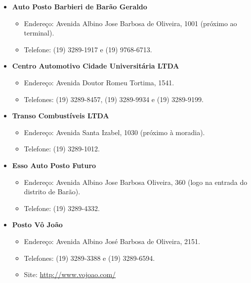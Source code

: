 \begin{itemize}
\item  \textbf{Auto Posto Barbieri de Barão Geraldo}
\begin{itemize}
\item  Endereço: Avenida Albino Jose Barbosa de Oliveira, 1001 (próximo ao terminal).
\item  Telefone: (19) 3289-1917 e (19) 9768-6713.
\end{itemize}
\end{itemize}

\begin{itemize}
\item  \textbf{Centro Automotivo Cidade Universitária LTDA}
\begin{itemize}
\item  Endereço: Avenida Doutor Romeu Tortima, 1541.
\item  Telefones: (19) 3289-8457, (19) 3289-9934 e (19) 3289-9199.
\end{itemize}
\end{itemize}

\begin{itemize}
\item  \textbf{Transo Combustíveis LTDA}
\begin{itemize}
\item  Endereço: Avenida Santa Izabel, 1030 (próximo à moradia).
\item  Telefone: (19) 3289-1012.
\end{itemize}
\end{itemize}

\begin{itemize}
\item  \textbf{Esso Auto Posto Futuro}
\begin{itemize}
\item  Endereço: Avenida Albino Jose Barbosa Oliveira, 360 (logo na entrada do distrito de Barão).
\item  Telefone: (19) 3289-4332.
\end{itemize}
\end{itemize}

\begin{itemize}
\item  \textbf{Posto Vô João}
\begin{itemize}
\item  Endereço: Avenida Albino José Barbosa de Oliveira, 2151.
\item  Telefones: (19) 3289-3388 e (19) 3289-6594.
\item  Site: \url{http://www.vojoao.com/}
\end{itemize}
\end{itemize}

